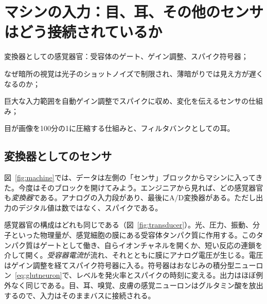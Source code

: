 \chapter{マシンの入力：目、耳、その他のセンサはどう接続されているか}
\label{sec:sensors}
\begin{chaptergoals}
\item 変換器としての感覚器官：受容体のゲート、ゲイン調整、スパイク符号器；
\item なぜ暗所の視覚は光子のショットノイズで制限され、薄暗がりでは見え方が遅くなるのか；
\item 巨大な入力範囲を自動ゲイン調整でスパイクに収め、変化を伝えるセンサの仕組み；
\item 目が画像を100分の1に圧縮する仕組みと、フィルタバンクとしての耳。
\end{chaptergoals}

\section{変換器としてのセンサ}

図~\ref{fig:machine}では、データは左側の「センサ」ブロックからマシンに入ってきた。今度はそのブロックを開けてみよう。エンジニアから見れば、どの感覚器官も\emph{変換器}である。アナログの入力段があり、最後にA/D変換器がある。ただし出力のデジタル値は数ではなく、スパイクである。

感覚器官の構成はどれも同じである（図~\ref{fig:transducer}）。光、圧力、振動、分子といった物理量が、感覚細胞の膜にある受容体タンパク質に作用する。このタンパク質はゲートとして働き、自らイオンチャネルを開くか、短い反応の連鎖を介して開く。\emph{受容器電流}が流れ、それとともに膜にアナログ電圧が生じる。電圧はゲイン調整を経てスパイク符号器に入る。符号器はおなじみの積分型ニューロン~\eqref{eq:glutneuron}で、レベルを発火率とスパイクの時刻に変える。出力はほぼ例外なく同じである。目、耳、嗅覚、皮膚の感覚ニューロンはグルタミン酸を放出するので、入力はそのままバスに接続される。

